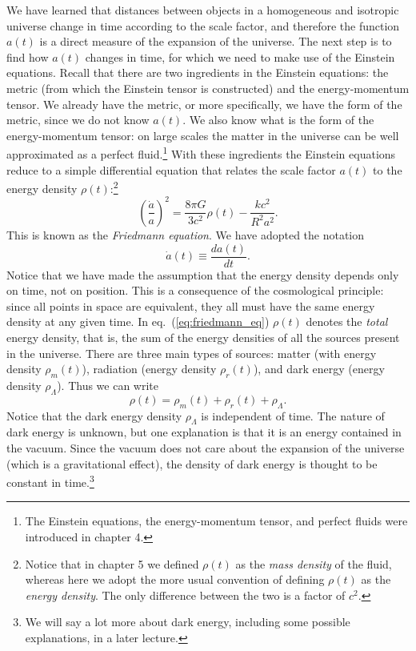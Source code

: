 We have learned that distances between objects in a homogeneous and isotropic universe change in time according to the scale factor, and therefore the function $a(t)$ is a direct measure of the expansion of the universe. The next step is to find how $a(t)$ changes in time, for which we need to make use of the Einstein equations. Recall that there are two ingredients in the Einstein equations: the metric (from which the Einstein tensor is constructed) and the energy-momentum tensor. We already have the metric, or more specifically, we have the form of the metric, since we do not know $a(t)$. We also know what is the form of the energy-momentum tensor: on large scales the matter in the universe can be well approximated as a perfect fluid.\footnote{The Einstein equations, the energy-momentum tensor, and perfect fluids were introduced in chapter 4.} With these ingredients the Einstein equations reduce to a simple differential equation that relates the scale factor $a(t)$ to the energy density $\rho(t)$:\footnote{
Notice that in chapter 5 we defined $\rho(t)$ as the {\it mass density} of the fluid, whereas here we adopt the more usual convention of defining $\rho(t)$ as the {\it energy density}. The only difference between the two is a factor of $c^2$.}
\begin{equation} \label{eq:friedmann_eq}
\left(\frac{\dot{a}}{a}\right)^2= \frac{8\pi G}{3c^2}\rho(t)-\frac{kc^2}{R^2a^2}.
\end{equation}
This is known as the {\it Friedmann equation}. We have adopted the notation
\begin{equation}
\dot{a}(t)\equiv \frac{da(t)}{dt}.
\end{equation}
Notice that we have made the assumption that the energy density depends only on time, not on position. This is a consequence of the cosmological principle: since all points in space are equivalent, they all must have the same energy density at any given time. In eq.\ (\ref{eq:friedmann_eq}) $\rho(t)$ denotes the {\it total} energy density, that is, the sum of the energy densities of all the sources present in the universe. There are three main types of sources: matter (with energy density $\rho_m(t)$), radiation (energy density $\rho_r(t)$), and dark energy (energy density $\rho_{\Lambda}$). Thus we can write
\begin{equation}
\rho(t)=\rho_m(t)+\rho_r(t)+\rho_{\Lambda}.
\end{equation}
Notice that the dark energy density $\rho_{\Lambda}$ is independent of time. The nature of dark energy is unknown, but one explanation is that it is an energy contained in the vacuum. Since the vacuum does not care about the expansion of the universe (which is a gravitational effect), the density of dark energy is thought to be constant in time.\footnote{We will say a lot more about dark energy, including some possible explanations, in a later lecture.}

